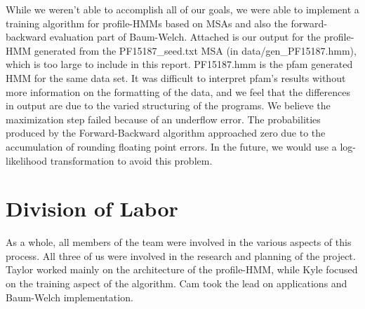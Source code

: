\documentclass{article}
\begin{document}
While we weren't able to accomplish all of our goals, we were able to implement a training algorithm for profile-HMMs based on MSAs and also the forward-backward evaluation part of Baum-Welch. Attached is our output for the profile-HMM generated from the PF15187\_seed.txt MSA (in data/gen\_PF15187.hmm), which is too large to include in this report. PF15187.hmm is the pfam generated HMM for the same data set. It was difficult to interpret pfam's results without more information on the formatting of the data, and we feel that the differences in output are due to the varied structuring of the programs. We believe the maximization step failed because of an underflow error. The probabilities produced by the Forward-Backward algorithm approached zero due to the accumulation of rounding floating point errors. In the future, we would use a log-likelihood transformation to avoid this problem.


\section{Division of Labor}
As a whole, all members of the team were involved in the various aspects of this process. All three of us were involved in the research and planning of the project. Taylor worked mainly on the architecture of the profile-HMM, while Kyle focused on the training aspect of the algorithm. Cam took the lead on applications and Baum-Welch implementation. 
\end{document}
